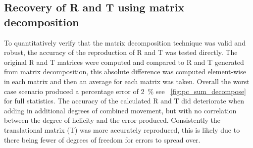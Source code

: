 \subsection{Recovery of R and T using matrix decomposition}

To quantitatively verify that the matrix decomposition technique was valid and robust, the accuracy of the reproduction of \gls{R} and \gls{T} was tested directly.
The original \gls{R} and \gls{T} matrices were computed and compared to \gls{R} and \gls{T} generated from matrix decomposition, this absolute difference was computed element-wise in each matrix and then an average for each matrix was taken.
Overall the worst case scenario produced a percentage error of \SI{2}{\percent} see \figurename~\ref{fig:pc_sum_decompose} for full statistics.
The accuracy of the calculated \gls{R} and \gls{T} did deteriorate when adding in additional degrees of combined movement, but with no correlation between the degree of helicity and the error produced.
Consistently the translational matrix (\gls{T}) was more accurately reproduced, this is likely due to there being fewer of degrees of freedom for errors to spread over.




